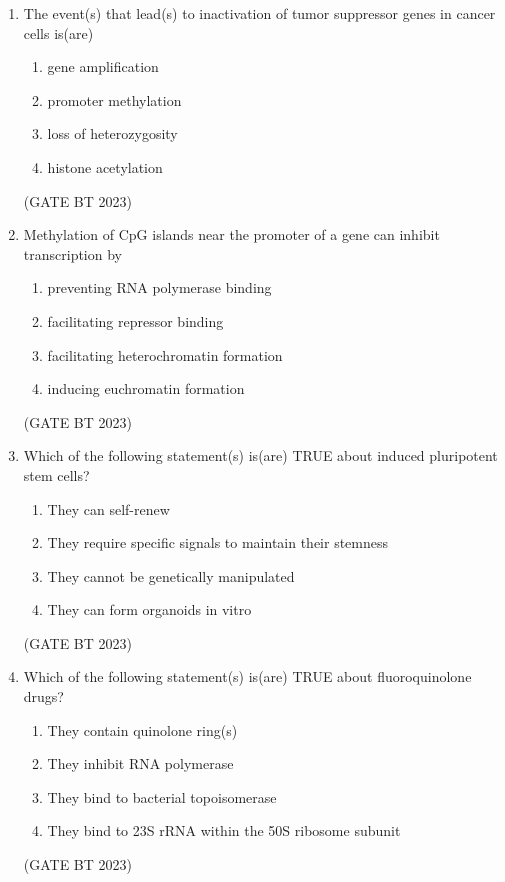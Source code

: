 \documentclass[journal,12pt,onecolumn]{IEEEtran}
\begin{document}
\begin{enumerate}
    \item The event(s) that lead(s) to inactivation of tumor suppressor genes in cancer cells is(are)
    \begin{enumerate}
        \item gene amplification
        \item promoter methylation
        \item loss of heterozygosity
        \item histone acetylation
    \end{enumerate}
    \hfill(GATE BT 2023)

    \item Methylation of CpG islands near the promoter of a gene can inhibit transcription by
    \begin{enumerate}
        \item preventing RNA polymerase binding
        \item facilitating repressor binding
        \item facilitating heterochromatin formation
        \item inducing euchromatin formation
    \end{enumerate}
    \hfill(GATE BT 2023)

    \item Which of the following statement(s) is(are) TRUE about induced pluripotent stem cells?
    \begin{enumerate}
        \item They can self-renew
        \item They require specific signals to maintain their stemness
        \item They cannot be genetically manipulated
        \item They can form organoids in vitro
    \end{enumerate}
    \hfill(GATE BT 2023)

    \item Which of the following statement(s) is(are) TRUE about fluoroquinolone drugs?
    \begin{enumerate}
        \item They contain quinolone ring(s)
        \item They inhibit RNA polymerase
        \item They bind to bacterial topoisomerase
        \item They bind to 23S rRNA within the 50S ribosome subunit
    \end{enumerate}
    \hfill(GATE BT 2023)


\end{enumerate}
\end{document}
